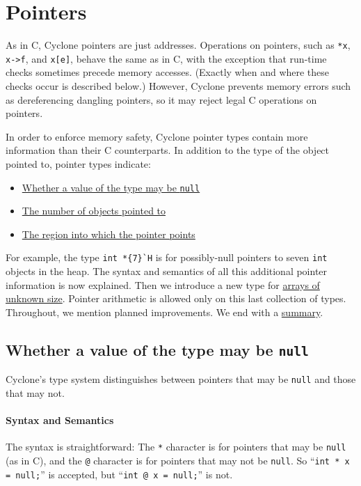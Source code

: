 \section{Pointers}
\label{sec:pointers}

As in C, Cyclone pointers are just addresses.  Operations on pointers,
such as \texttt{*x}, \texttt{x->f}, and \texttt{x[e]}, behave the same
as in C, with the exception that run-time checks sometimes precede
memory accesses.  (Exactly when and where these checks occur is
described below.)  However, Cyclone prevents memory errors such as
dereferencing dangling pointers, so it may reject legal C operations
on pointers.

In order to enforce memory safety, Cyclone pointer types contain more
information than their C counterparts.  In addition to the type of the
object pointed to, pointer types indicate:

\begin{itemize}
\item \hyperlink{pointer_null}{Whether a value of the type may be
    \texttt{null}}
\item \hyperlink{pointer_bound}{The number of objects pointed to}
\item \hyperlink{pointer_region}{The region into which the pointer
    points}
\end{itemize}

For example, the type \verb|int *{7}`H| is for possibly-null
pointers to seven \texttt{int} objects in the heap.  The syntax and
semantics of all this additional pointer information is now explained.
Then we introduce a new type for \hyperlink{pointer_unknown}{arrays of
  unknown size}.  Pointer arithmetic is allowed only on this last
collection of types.  Throughout, we mention planned improvements.  We
end with a \hyperlink{pointer_summary}{summary}.

\subsection*{\hypertarget{pointer_null}{Whether a value of the type may be
    \texttt{null}}}

Cyclone's type system distinguishes between pointers that may be
\texttt{null} and those that may not.

\paragraph{Syntax and Semantics} The syntax is straightforward:
The \texttt{*} character is for pointers that may be \texttt{null} (as in
C), and the \texttt{@} character is for pointers that may not be
\texttt{null}.  So ``\texttt{int * x = null;}'' is accepted, but
``\texttt{int @ x = null;}'' is not.


